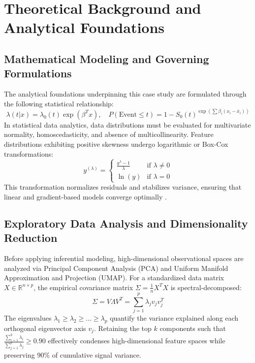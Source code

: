 \section{Theoretical Background and Analytical Foundations}

\subsection{Mathematical Modeling and Governing Formulations}
The analytical foundations underpinning this case study are formulated through the following statistical relationship:
\begin{equation}
  \lambda(t|x) = \lambda_0(t) \exp(\beta^T x), \quad P(\text{Event} \le t) = 1 - S_0(t)^{\exp(\sum \beta_i (x_i - \bar{x}_i))}
\label{eq:core_math}
\end{equation}
In statistical data analytics, data distributions must be evaluated for multivariate normality, homoscedasticity, and absence of multicollinearity. Feature distributions exhibiting positive skewness undergo logarithmic or Box-Cox transformations:
\begin{equation}
  y^{(\lambda)} = \begin{cases} \frac{y^\lambda - 1}{\lambda} & \text{if } \lambda \neq 0 \\ \ln(y) & \text{if } \lambda = 0 \end{cases}
\end{equation}
This transformation normalizes residuals and stabilizes variance, ensuring that linear and gradient-based models converge optimally \cite{wickham2016r}.

\subsection{Exploratory Data Analysis and Dimensionality Reduction}
Before applying inferential modeling, high-dimensional observational spaces are analyzed via Principal Component Analysis (PCA) and Uniform Manifold Approximation and Projection (UMAP). For a standardized data matrix $X \in \mathbb{R}^{n \times p}$, the empirical covariance matrix $\Sigma = \frac{1}{n} X^T X$ is spectral-decomposed:
\begin{equation}
  \Sigma = V \Lambda V^T = \sum_{j=1}^p \lambda_j v_j v_j^T
\end{equation}
The eigenvalues $\lambda_1 \ge \lambda_2 \ge \dots \ge \lambda_p$ quantify the variance explained along each orthogonal eigenvector axis $v_j$. Retaining the top $k$ components such that $\frac{\sum_{i=1}^k \lambda_i}{\sum_{j=1}^p \lambda_j} \ge 0.90$ effectively condenses high-dimensional feature spaces while preserving $90\%$ of cumulative signal variance.

